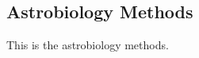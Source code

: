 \subsection{Astrobiology Methods}
\label{sec:Astrobiology Methods}

This is the astrobiology methods.
